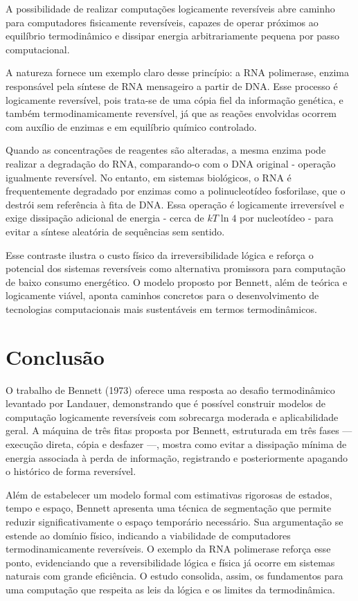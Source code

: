 \documentclass[conference]{IEEEtran}
\begin{document}
A possibilidade de realizar computações logicamente reversíveis abre caminho para computadores fisicamente reversíveis, capazes de operar próximos ao equilíbrio termodinâmico e dissipar energia arbitrariamente pequena por passo computacional.

A natureza fornece um exemplo claro desse princípio: a RNA polimerase, enzima responsável pela síntese de RNA mensageiro a partir de DNA. Esse processo é logicamente reversível, pois trata-se de uma cópia fiel da informação genética, e também termodinamicamente reversível, já que as reações envolvidas ocorrem com auxílio de enzimas e em equilíbrio químico controlado.

Quando as concentrações de reagentes são alteradas, a mesma enzima pode realizar a degradação do RNA, comparando-o com o DNA original - operação igualmente reversível. No entanto, em sistemas biológicos, o RNA é frequentemente degradado por enzimas como a polinucleotídeo fosforilase, que o destrói sem referência à fita de DNA. Essa operação é logicamente irreversível e exige dissipação adicional de energia - cerca de $kT\ln4$ por nucleotídeo - para evitar a síntese aleatória de sequências sem sentido.

Esse contraste ilustra o custo físico da irreversibilidade lógica e reforça o potencial dos sistemas reversíveis como alternativa promissora para computação de baixo consumo energético. O modelo proposto por Bennett, além de teórica e logicamente viável, aponta caminhos concretos para o desenvolvimento de tecnologias computacionais mais sustentáveis em termos termodinâmicos.

\section{Conclusão}

O trabalho de Bennett (1973) oferece uma resposta ao desafio termodinâmico levantado por Landauer, demonstrando que é possível construir modelos de computação logicamente reversíveis com sobrecarga moderada e aplicabilidade geral. A máquina de três fitas proposta por Bennett, estruturada em três fases — execução direta, cópia e desfazer —, mostra como evitar a dissipação mínima de energia associada à perda de informação, registrando e posteriormente apagando o histórico de forma reversível.

Além de estabelecer um modelo formal com estimativas rigorosas de estados, tempo e espaço, Bennett apresenta uma técnica de segmentação que permite reduzir significativamente o espaço temporário necessário. Sua argumentação se estende ao domínio físico, indicando a viabilidade de computadores termodinamicamente reversíveis. O exemplo da RNA polimerase reforça esse ponto, evidenciando que a reversibilidade lógica e física já ocorre em sistemas naturais com grande eficiência. O estudo consolida, assim, os fundamentos para uma computação que respeita as leis da lógica e os limites da termodinâmica.
\end{document}
